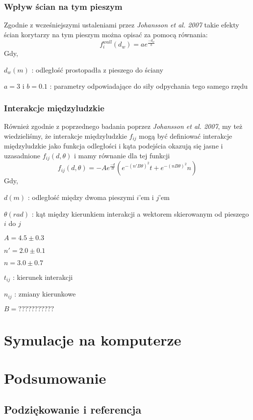 \documentclass[12pt, a4paper]{report}
\begin{document}
\subsection{Wpływ ścian na tym pieszym}
\hspace{4ex}Zgodnie z wcześniejszymi ustaleniami przez {\it Johansson et al. 2007} takie efekty ścian korytarzy na tym pieszym można opisać za pomocą równania:
$$
f_i^{wall}(d_w) = ae^{\frac{-d_w}{b}}
$$
Gdy, \\
\centerline{$d_w (m)$ : odległość prostopadła z pieszego do ściany}
\centerline{$a = 3$ i $b = 0.1$ : parametry odpowiadające do siły odpychania tego samego rzędu}
\subsection{Interakcje międzyludzkie}
\hspace{4ex}Również zgodnie z poprzednego badania poprzez {\it Johansson et al. 2007}, my też wiedzieliśmy, że interakcje międzyludzkie $f_{ij}$ mogą być definiować interakcje międzyludzkie jako funkcja odległości i kąta podejścia okazują się jasne i uzasadnione $f_{ij}(d,\theta)$ i mamy równanie dla tej funkcji
\newpage
$$
f_{ij}(d,\theta) = -Ae^{\frac{-d}{B}}(e^{-(n'B\theta)^2}t + e^{-(nB\theta)^2}n)
$$
Gdy,\\
\centerline{$d(m)$ : odległość między dwoma pieszymi $i$'em i $j$'em}
\centerline{$\theta(rad)$ : kąt między kierunkiem interakcji a wektorem skierowanym od pieszego $i$ do $j$}
\centerline{$A = 4.5 \pm 0.3$}
\centerline{$n' = 2.0 \pm 0.1$}
\centerline{$n = 3.0 \pm 0.7$}
\centerline{$t_{ij}$ : kierunek interakcji}
\centerline{$n_{ij}$ : zmiany kierunkowe}
\centerline{$B = ???????????$}

\chapter{Symulacje na komputerze}

\chapter{Podsumowanie}

\section*{Podziękowanie i referencja}
\end{document}

